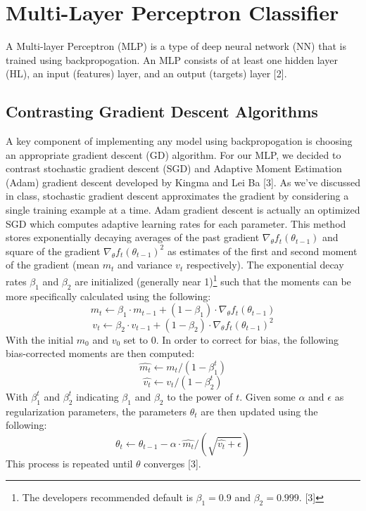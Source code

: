 \documentclass{article}
\begin{document}
\section{Multi-Layer Perceptron Classifier}
A Multi-layer Perceptron (MLP) is a type of deep neural network (NN) that is trained using backpropogation. An MLP consists of at least one hidden layer (HL), an input (features) layer, and an output (targets) layer [2].  

\subsection{Contrasting Gradient Descent Algorithms}
A key component of implementing any model using backpropogation is choosing an appropriate gradient descent (GD) algorithm. For our MLP, we decided to contrast stochastic gradient descent (SGD) and Adaptive Moment Estimation (Adam) gradient descent developed by Kingma and Lei Ba [3]. As we've discussed in class, stochastic gradient descent approximates the gradient by considering a single training example at a time. Adam gradient descent is actually an optimized SGD which computes adaptive learning rates for each parameter. This method stores exponentially decaying averages of the past gradient $\nabla_\theta f_t(\theta_{t-1})$ and square of the gradient $\nabla_\theta f_t(\theta_{t-1})^2$ as estimates of the first and second moment of the gradient (mean $m_t$ and variance $v_t$ respectively). The exponential decay rates $\beta_1$ and $\beta_2$ are initialized (generally near 1)\footnote{The developers recommended default is $\beta_1 = 0.9$ and $\beta_2 = 0.999$. [3]} such that the moments can be more specifically calculated using the following:
$$m_t \leftarrow \beta_1 \cdot m_{t-1} + (1-\beta_1)\cdot \nabla_\theta f_t(\theta_{t-1}) $$
$$v_t \leftarrow \beta_2 \cdot v_{t-1} + (1-\beta_2)\cdot \nabla_\theta f_t(\theta_{t-1})^2 $$
With the initial $m_0$ and $v_0$ set to 0. In order to correct for bias, the following bias-corrected moments are then computed:
$$\hat{m_t} \leftarrow m_t/(1-\beta_1^t)$$
$$\hat{v_t} \leftarrow v_t/(1-\beta_2^t)$$
With $\beta_1^t$ and $\beta_2^t$ indicating $\beta_1$ and $\beta_2$ to the power of $t$. Given some $\alpha$ and $\epsilon$ as regularization parameters, the parameters $\theta_t$ are then updated using the following:
$$\theta_t \leftarrow \theta_{t-1} - \alpha \cdot \hat{m_t}/(\sqrt{\hat{v_t}+\epsilon})$$
This process is repeated until $\theta$ converges [3].   
\end{document}
